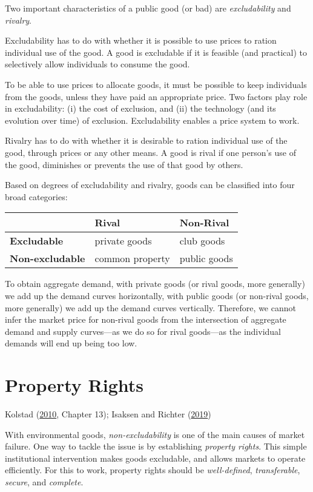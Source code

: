 \documentclass[
]{book}
\begin{document}
Two important characteristics of a public good (or bad) are \emph{excludability} and \emph{rivalry}.

Excludability has to do with whether it is possible to use prices to ration individual use of the good. A good is excludable if it is feasible (and practical) to selectively allow individuals to consume the good.

To be able to use prices to allocate goods, it must be possible to keep individuals from the goods, unless they have paid an appropriate price. Two factors play role in excludability: (i) the cost of exclusion, and (ii) the technology (and its evolution over time) of exclusion. Excludability enables a price system to work.

Rivalry has to do with whether it is desirable to ration individual use of the good, through prices or any other means. A good is rival if one person's use of the good, diminishes or prevents the use of that good by others.

Based on degrees of excludability and rivalry, goods can be classified into four broad categories:

\begin{longtable}[]{@{}lll@{}}
\toprule
& \textbf{Rival} & \textbf{Non-Rival}\tabularnewline
\midrule
\endhead
\textbf{Excludable} & private goods & club goods\tabularnewline
\textbf{Non-excludable} & common property & public goods\tabularnewline
\bottomrule
\end{longtable}

To obtain aggregate demand, with private goods (or rival goods, more generally) we add up the demand curves horizontally, with public goods (or non-rival goods, more generally) we add up the demand curves vertically. Therefore, we cannot infer the market price for non-rival goods from the intersection of aggregate demand and supply curves---as we do so for rival goods---as the individual demands will end up being too low.

\hypertarget{property-rights}{%
\chapter{Property Rights}\label{property-rights}}

Kolstad (\protect\hyperlink{ref-kolstad2010}{2010}, Chapter 13); Isaksen and Richter (\protect\hyperlink{ref-isaksen2019}{2019})

With environmental goods, \emph{non-excludability} is one of the main causes of market failure. One way to tackle the issue is by establishing \emph{property rights}. This simple institutional intervention makes goods excludable, and allows markets to operate efficiently. For this to work, property rights should be \emph{well-defined}, \emph{transferable}, \emph{secure}, and \emph{complete}.
\end{document}
